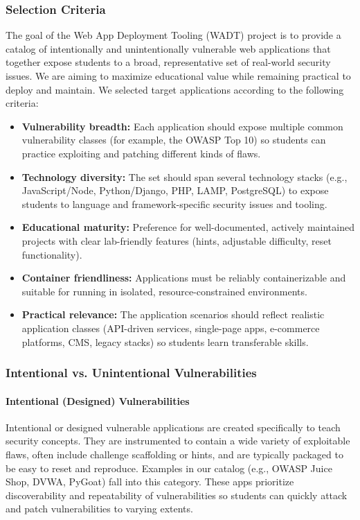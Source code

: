 \documentclass[12pt]{article}
\begin{document}
\subsubsection{Selection Criteria}
The goal of the Web App Deployment Tooling (WADT) project is to provide a catalog of intentionally and unintentionally vulnerable web applications that together expose students to a broad, representative set of real-world security issues. We are aiming to maximize educational value while remaining practical to deploy and maintain. We selected target applications according to the following criteria:

\begin{itemize}
    \item \textbf{Vulnerability breadth:} Each application should expose multiple common vulnerability classes (for example, the OWASP Top 10) so students can practice exploiting and patching different kinds of flaws.
    \item \textbf{Technology diversity:} The set should span several technology stacks (e.g., JavaScript/Node, Python/Django, PHP, LAMP, PostgreSQL) to expose students to language and framework-specific security issues and tooling.
    \item \textbf{Educational maturity:} Preference for well-documented, actively maintained projects with clear lab-friendly features (hints, adjustable difficulty, reset functionality).
    \item \textbf{Container friendliness:} Applications must be reliably containerizable and suitable for running in isolated, resource-constrained environments.
    \item \textbf{Practical relevance:} The application scenarios should reflect realistic application classes (API-driven services, single-page apps, e-commerce platforms, CMS, legacy stacks) so students learn transferable skills.
\end{itemize}

\subsubsection{Intentional vs. Unintentional Vulnerabilities}

\paragraph{Intentional (Designed) Vulnerabilities}
Intentional or designed vulnerable applications are created specifically to teach security concepts. They are instrumented to contain a wide variety of exploitable flaws, often include challenge scaffolding or hints, and are typically packaged to be easy to reset and reproduce. Examples in our catalog (e.g., OWASP Juice Shop, DVWA, PyGoat) fall into this category. These apps prioritize discoverability and repeatability of vulnerabilities so students can quickly attack and patch vulnerabilities to varying extents.
\end{document}
